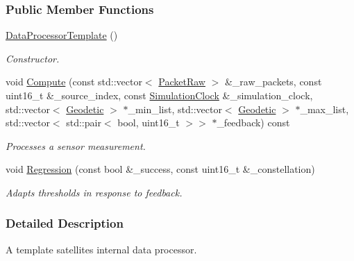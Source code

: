 \subsubsection*{Public Member Functions}
\begin{DoxyCompactItemize}
\item 
\mbox{\label{classosse_1_1collaborate_1_1_data_processor_template_ad4b855d7eb850e218b367c87e481bcd7}} 
\hyperlink{classosse_1_1collaborate_1_1_data_processor_template_ad4b855d7eb850e218b367c87e481bcd7}{Data\+Processor\+Template} ()
\begin{DoxyCompactList}\small\item\em Constructor. \end{DoxyCompactList}\item 
void \hyperlink{classosse_1_1collaborate_1_1_data_processor_template_a01a3532d55daf656a30232dab91e293e}{Compute} (const std\+::vector$<$ \hyperlink{classosse_1_1collaborate_1_1_packet_raw}{Packet\+Raw} $>$ \&\+\_\+raw\+\_\+packets, const uint16\+\_\+t \&\+\_\+source\+\_\+index, const \hyperlink{classosse_1_1collaborate_1_1_simulation_clock}{Simulation\+Clock} \&\+\_\+simulation\+\_\+clock, std\+::vector$<$ \hyperlink{classosse_1_1collaborate_1_1_geodetic}{Geodetic} $>$ $\ast$\+\_\+min\+\_\+list, std\+::vector$<$ \hyperlink{classosse_1_1collaborate_1_1_geodetic}{Geodetic} $>$ $\ast$\+\_\+max\+\_\+list, std\+::vector$<$ std\+::pair$<$ bool, uint16\+\_\+t $>$$>$ $\ast$\+\_\+feedback) const
\begin{DoxyCompactList}\small\item\em Processes a sensor measurement. \end{DoxyCompactList}\item 
void \hyperlink{classosse_1_1collaborate_1_1_data_processor_template_a3cf1401b98a7e06852f3f46d464308ea}{Regression} (const bool \&\+\_\+success, const uint16\+\_\+t \&\+\_\+constellation)
\begin{DoxyCompactList}\small\item\em Adapts thresholds in response to feedback. \end{DoxyCompactList}\end{DoxyCompactItemize}


\subsubsection{Detailed Description}
A template satellite\textquotesingle{}s internal data processor. 

